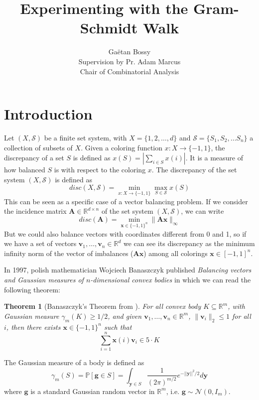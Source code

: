 \documentclass[12pt]{article}
\title{Experimenting with the Gram-Schmidt Walk}
\author{Gaëtan Bossy\\
Supervision by Pr. Adam Marcus\\
Chair of Combinatorial Analysis\\}
\newtheorem{theorem}{Theorem}
\begin{document}
\maketitle


\section{Introduction}
Let $(X, \mathcal{S})$ be a finite set system, with $X = \{1, 2, \dots, d\}$ and $\mathcal{S}= \{S_1, S_2, \dots S_n\}$ a collection of subsets of $X$. Given a coloring function $x : X \rightarrow \{-1, 1\}$, the discrepancy of a set $S$ is defined as $x(S)= |\sum_{i \in S}x(i)|$. It is a measure of how balanced $S$ is with respect to the coloring $x$. The discrepancy of the set system $(X,\mathcal{S})$ is defined as 
$$disc(X,\mathcal{S}) = \min_{x: X\rightarrow \{-1, 1\}} \max_{S \in \mathcal{S}} x(S)$$
This can be seen as a specific case of a vector balancing problem. If we consider the incidence matrix $\textbf{A} \in \mathbb{R}^{d \times n}$ of the set system $(X, \mathcal{S})$, we can write 
$$ disc(\textbf{A})= \min_{\textbf{x} \in \{-1, 1\}^n} \|\textbf{A}\textbf{x}\|_\infty$$
But we could also balance vectors with coordinates different from 0 and 1, so if we have a set of vectors $\textbf{v}_1,\dots,\textbf{v}_n\in\mathbb{R}^d$ we can see its discrepancy as the minimum infinity norm of the vector of imbalances ($\textbf{Ax}$) among all colorings $\textbf{x}\in[-1,1]^n$.

In 1997, polish mathematician Wojciech Banaszczyk published \textit{Balancing vectors and Gaussian measures of $n$-dimensional convex bodies}\cite{banaszczyk1998balancing} in which we can read the following theorem:
\begin{theorem}[Banaszczyk's Theorem from \cite{banaszczyk1998balancing}]\label{banaszczyk}
For all convex body $K \subseteq \mathbb{R}^m$, with Gaussian measure $\gamma_m(K)\geq 1/2$, and given $\textbf{v}_1, \dots, \textbf{v}_n \in \mathbb{R}^m$, $\|\textbf{v}_i\|_2 \leq 1$ for all $i$, then there exists $ \textbf{x} \in \{-1, 1\}^n$ such that
$$\sum_{i=1}^n \textbf{x}(i)\textbf{v}_i \in 5 \cdot K $$
\end{theorem}
The Gaussian measure of a body is defined as $$\gamma_m(S) = \mathbb{P}[\textbf{g} \in S] = \int_{\textbf{y} \in S} \frac{1}{(2 \pi)^{m/2}} e^{-||\textbf{y}||^2/2} d\textbf{y}$$
    where $\textbf{g}$ is a standard Gaussian random vector in $\mathbb{R}^m$, i.e. $\textbf{g} \sim \mathcal{N}(0, I_m)$. 
\end{document}
